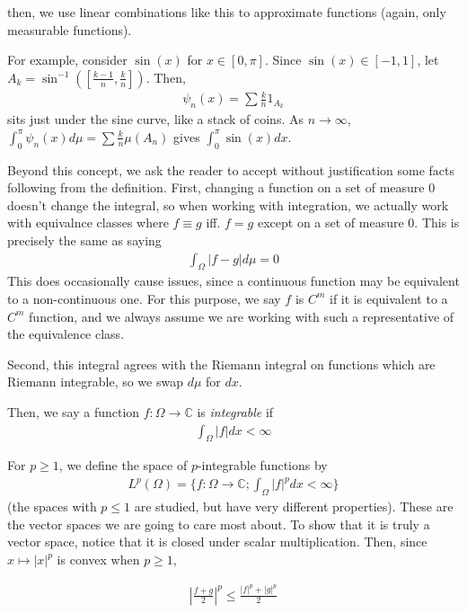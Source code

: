 \documentclass{article}
\newcommand{\C}{{\mathbb{C}}}
\begin{document}
	then, we use linear combinations like this to approximate functions (again, only measurable functions). 
	
	For example, consider $\sin(x)$ for $x \in [0,\pi]$. Since $\sin(x) \in [-1,1]$, let $A_{k} = \sin^{-1}([\frac{k-1}{n}, \frac{k}{n}])$. Then,
	\begin{align*}
		\psi_{n}(x) = \sum \frac{k}{n} 1_{A_{k}}
	\end{align*}
	sits just under the sine curve, like a stack of coins. As $n \to \infty$, $\int_{0}^{\pi} \psi_{n}(x) d\mu = \sum \frac{k}{n} \mu(A_n)$ gives $\int_{0}^{\pi} \sin(x)dx$. 
	
	Beyond this concept, we ask the reader to accept without justification some facts following from the definition. First, changing a function on a set of measure 0 doesn't change the integral, so when working with integration, we actually work with equivalnce classes where $f \equiv g$ iff. $f=g$ except on a set of measure $0$. This is precisely the same as saying 
	\begin{align*}
		\int_{\Omega} |f-g| d\mu = 0
	\end{align*}
	This does occasionally cause issues, since a continuous function may be equivalent to a non-continuous one. For this purpose, we say $f $ is $C^{m}$ if it is equivalent to a $C^{m}$ function, and we always assume we are working with such a representative of the equivalence class. 
	
	Second, this integral agrees with the Riemann integral on functions which are Riemann integrable, so we swap $d\mu$ for $dx$. 
	
	Then, we say a function $f: \Omega \to \C$ is \textit{integrable} if 
	\begin{align*}
		\int_{\Omega} |f|dx < \infty
	\end{align*}
	
	For $p \geq 1$, we define the space of $p$-integrable functions by 
	\begin{align*}
		L^{p}(\Omega) = \{ f: \Omega \to \C; \int_{\Omega} |f|^{p} dx < \infty\}
	\end{align*}
	(the spaces with $p \leq 1$ are studied, but have very different properties). These are the vector spaces we are going to care most about. To show that it is truly a vector space, notice that it is closed under scalar multiplication. Then, since $x \mapsto |x|^{p}$ is convex when $p \geq 1$,
	
	\begin{align*}
		|\frac{f+g}{2}|^{p} \leq \frac{|f|^{p} + |g|^{p}}{2}
	\end{align*}
	
\end{document}
